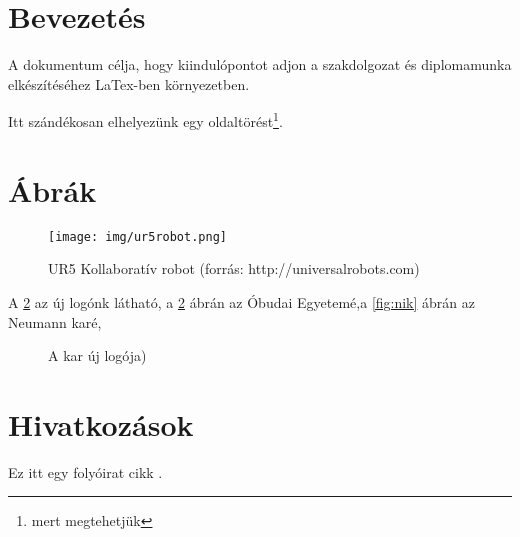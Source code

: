 \documentclass[12pt,a4paper]{article}
\author{Gipsz Jakab}
\begin{document}
	\maketitle
	\makeassigmentpage
	\makedeclaration
	\setcounter{page}{1} %
	\setalgorithmcounter %
	
	\maketoc
	
	\section{Bevezetés}
	A dokumentum célja, hogy kiindulópontot adjon a szakdolgozat és diplomamunka elkészítéséhez LaTex-ben környezetben. 
	
	Itt szándékosan elhelyezünk egy oldaltörést\footnote{mert megtehetjük}.
	\pagebreak
	
	\section{Ábrák}
	
	\begin{figure}[h]
		\centering
		\texttt{[image: img/ur5robot.png]}
		\caption[UR5 Koolabortív robot]{UR5 Kollaboratív robot (forrás: http://universalrobots.com)}
		\label{fig:robotik-bin-picking}
	\end{figure}
	
	
	A \ref{fig:ujlogo} az új logónk látható, a \ref{fig:ujlogo} ábrán az Óbudai Egyetemé,a \ref{fig:nik} ábrán az Neumann karé,
	
	\begin{figure}[H]
        \centering
        \qquad %
        \caption{A kar új logója)}
        \label{fig:ujlogo}
    \end{figure}
	
	\section{Hivatkozások}
	
	Ez itt egy folyóirat cikk \cite{journal-example}.
	
\end{document}
